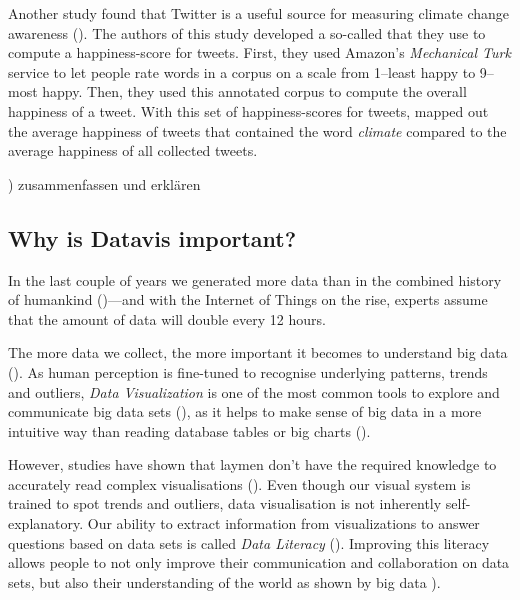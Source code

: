 Another study found that Twitter is a useful source for measuring climate change awareness (\cite{cody_climate_2015}). The authors of this study developed a so-called  that they use to compute a happiness-score for tweets. First, they used Amazon's \emph{Mechanical Turk} service to let people rate words in a corpus on a scale from 1--least happy to 9--most happy. Then, they used this annotated corpus to compute the overall happiness of a tweet. With this set of happiness-scores for tweets, \citeauthor{cody_climate_2015} mapped out the average happiness of tweets that contained the word \emph{climate} compared to the average happiness of all collected tweets.

\cite{takabe_twitter_2016}) zusammenfassen und erklären


\subsection{Why is Datavis important?}


In the last couple of years we generated more data than in the combined history of humankind (\cite{helbing2019will})---and with the Internet of Things on the rise, experts assume that the amount of data will double every 12 hours.

The more data we collect, %
the more important it becomes to understand big data (\cite{borner_data_2019}). As human perception is fine-tuned to recognise underlying patterns, trends and outliers, \emph{Data Visualization} is one of the most common tools to explore and communicate big data sets (\cite{heer_tour_2010}), as it helps to make sense of big data in a more intuitive way than reading database tables or big charts (\cite{donalek_immersive_2014}).

However, studies have shown that laymen don't have the required knowledge to accurately read complex visualisations (\cite{borner_investigating_2016}). %
Even though our visual system is trained to spot trends and outliers, data visualisation is not inherently self-explanatory. Our ability to extract information from visualizations to answer questions based on data sets is called \emph{Data Literacy} (\cite{boy_principled_2014}). Improving this literacy allows people to not only improve their communication and collaboration on data sets, but also their understanding of the world as shown by big data \cite{borner_data_2019}). 
